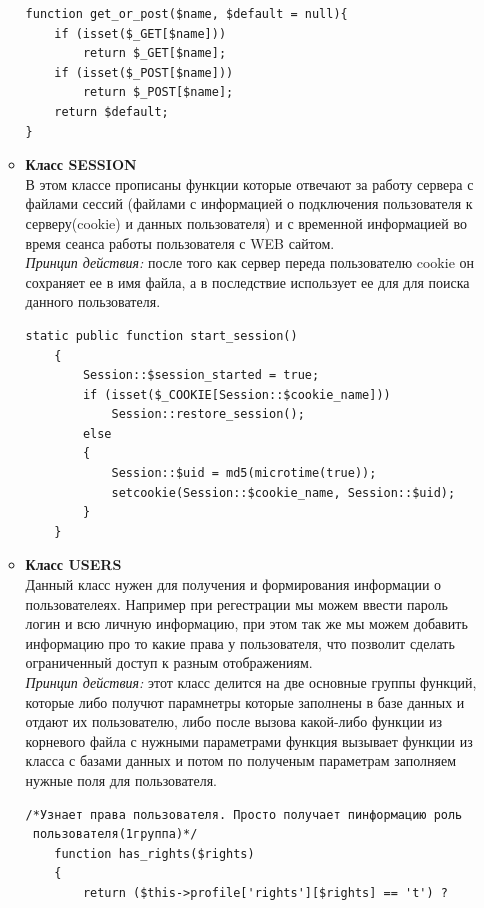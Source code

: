 \documentclass[a4paper]{article}
\begin{document}
\begin{enumerate}
\begin{itemize}
\begin{small}
\begin{verbatim}  
function get_or_post($name, $default = null){
    if (isset($_GET[$name]))
        return $_GET[$name];
    if (isset($_POST[$name]))
        return $_POST[$name];
    return $default;
}
\end{verbatim}
\end{small}
\item \textbf{Класс SESSION}\\
В этом классе прописаны функции которые отвечают за работу сервера с файлами сессий (файлами с информацией о подключения пользователя к серверу(cookie) и данных пользователя) и с временной информацией во время сеанса работы пользователя с WEB сайтом.\\ \textsl{Принцип действия:} после того как сервер переда пользователю cookie он сохраняет ее в имя файла, а в последствие использует ее для для поиска данного пользователя. 
\begin{small}
\begin{verbatim}  
static public function start_session()
    {
        Session::$session_started = true;
        if (isset($_COOKIE[Session::$cookie_name]))
            Session::restore_session();
        else
        {
            Session::$uid = md5(microtime(true));
            setcookie(Session::$cookie_name, Session::$uid);
        }
    }
\end{verbatim}
\end{small}
\item \textbf{Класс USERS}\\ 
Данный класс нужен для получения и формирования информации о пользователеях.  Например при регестрации мы можем ввести пароль логин и всю личную информацию, при этом так же мы можем добавить информацию про то какие права у пользователя, что позволит сделать ограниченный доступ к разным отображениям.\\ \textsl{Принцип действия:} этот класс делится на две основные группы функций, которые либо получют парамнетры которые заполнены в базе данных и отдают их пользователю, либо после вызова какой-либо функции из корневого файла с нужными параметрами функция вызывает функции из класса с базами данных и потом по полученым параметрам заполняем нужные поля для пользователя. 
\begin{small}
\begin{verbatim}    
/*Узнает права пользователя. Просто получает пинформацию роль
 пользователя(1группа)*/
    function has_rights($rights)
    {
        return ($this->profile['rights'][$rights] == 't') ?

\end{verbatim}
\end{small}
\end{itemize}
\end{enumerate}
\end{document}
